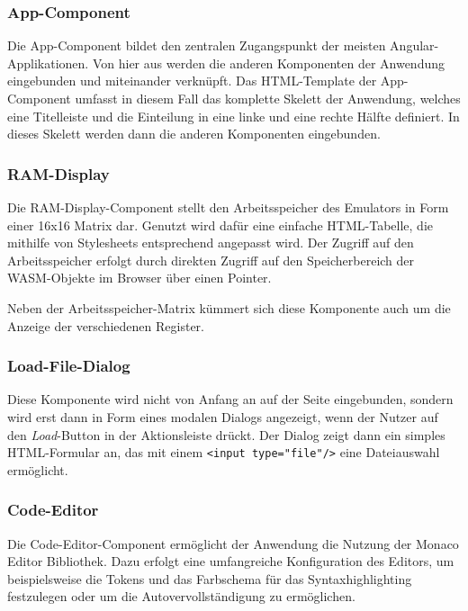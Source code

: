 \subsubsection{App-Component}

Die App-Component bildet den zentralen Zugangspunkt der meisten Angular-Applikationen. Von hier aus werden die anderen Komponenten der Anwendung eingebunden und miteinander verknüpft.
Das HTML-Template der App-Component umfasst in diesem Fall das komplette Skelett der Anwendung, welches eine Titelleiste und die Einteilung in eine linke und eine rechte Hälfte definiert.
In dieses Skelett werden dann die anderen Komponenten eingebunden.

\subsubsection{\ac{RAM}-Display}

Die \ac{RAM}-Display-Component stellt den Arbeitsspeicher des Emulators in Form einer 16x16 Matrix dar. Genutzt wird dafür eine einfache HTML-Tabelle, die mithilfe von Stylesheets entsprechend angepasst wird. Der Zugriff auf den Arbeitsspeicher erfolgt durch direkten Zugriff auf den Speicherbereich der \ac{WASM}-Objekte im Browser über einen Pointer.

Neben der Arbeitsspeicher-Matrix kümmert sich diese Komponente auch um die Anzeige der verschiedenen Register.

\subsubsection{Load-File-Dialog}

Diese Komponente wird nicht von Anfang an auf der Seite eingebunden, sondern wird erst dann in Form eines modalen Dialogs angezeigt, wenn der Nutzer auf den \textit{Load}-Button in der Aktionsleiste drückt. Der Dialog zeigt dann ein simples HTML-Formular an, das mit einem \texttt{<input type="file"/>} eine Dateiauswahl ermöglicht.

\subsubsection{Code-Editor}

Die Code-Editor-Component ermöglicht der Anwendung die Nutzung der Monaco Editor Bibliothek. Dazu erfolgt eine umfangreiche Konfiguration des Editors, um beispielsweise die Tokens und das Farbschema für das Syntaxhighlighting festzulegen oder um die Autovervollständigung zu ermöglichen.

